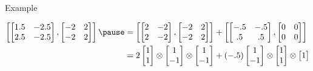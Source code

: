 \documentclass{beamer}
\begin{document}
\begin{frame}{Example}

\begin{footnotesize}
\begin{equation*}
\begin{aligned}
\begin{bmatrix}
\begin{bmatrix}
1.5 & -2.5\\
2.5 & -2.5
\end{bmatrix}
,
\begin{bmatrix}
-2 & 2\\
-2 & 2
\end{bmatrix}
\end{bmatrix}
\pause
&=
\begin{bmatrix}
\begin{bmatrix}
2 & -2\\
2 & -2
\end{bmatrix}
,
\begin{bmatrix}
-2 & 2\\
-2 & 2
\end{bmatrix}
\end{bmatrix}
+
\begin{bmatrix}
\begin{bmatrix}
-.5 & -.5\\
.5 & .5
\end{bmatrix}
,
\begin{bmatrix}
0 & 0\\
0 & 0
\end{bmatrix}
\end{bmatrix}\\
&=
2
\begin{bmatrix}
1\\
1
\end{bmatrix}
\otimes 
\begin{bmatrix}
1\\
-1
\end{bmatrix}
\otimes
\begin{bmatrix}
1\\
-1
\end{bmatrix}
+
(-.5)
\begin{bmatrix}
1\\
-1
\end{bmatrix}
\otimes
\begin{bmatrix}
1\\
1
\end{bmatrix}
\otimes
\begin{bmatrix}
1\\

\end{bmatrix}
\end{aligned}
\end{equation*}
\end{footnotesize}
\end{frame}
\end{document}

